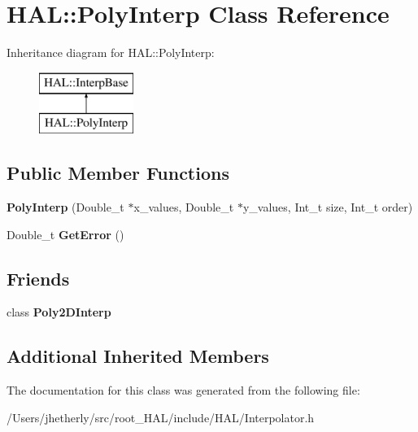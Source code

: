 \hypertarget{class_h_a_l_1_1_poly_interp}{\section{H\+A\+L\+:\+:Poly\+Interp Class Reference}
\label{class_h_a_l_1_1_poly_interp}
}
Inheritance diagram for H\+A\+L\+:\+:Poly\+Interp\+:\begin{figure}[H]
\begin{center}
\leavevmode
\includegraphics[height=2.000000cm]{class_h_a_l_1_1_poly_interp}
\end{center}
\end{figure}
\subsection*{Public Member Functions}
\begin{DoxyCompactItemize}
\item 
\hypertarget{class_h_a_l_1_1_poly_interp_af44f92e27052c066755a5beae2dc7b1b}{{\bfseries Poly\+Interp} (Double\+\_\+t $\ast$x\+\_\+values, Double\+\_\+t $\ast$y\+\_\+values, Int\+\_\+t size, Int\+\_\+t order)}\label{class_h_a_l_1_1_poly_interp_af44f92e27052c066755a5beae2dc7b1b}

\item 
\hypertarget{class_h_a_l_1_1_poly_interp_a1d87892f07ecdacaf6467a63371f044e}{Double\+\_\+t {\bfseries Get\+Error} ()}\label{class_h_a_l_1_1_poly_interp_a1d87892f07ecdacaf6467a63371f044e}

\end{DoxyCompactItemize}
\subsection*{Friends}
\begin{DoxyCompactItemize}
\item 
\hypertarget{class_h_a_l_1_1_poly_interp_a1d517ab352221a0d0a7fbfc8698724d7}{class {\bfseries Poly2\+D\+Interp}}\label{class_h_a_l_1_1_poly_interp_a1d517ab352221a0d0a7fbfc8698724d7}

\end{DoxyCompactItemize}
\subsection*{Additional Inherited Members}


The documentation for this class was generated from the following file\+:\begin{DoxyCompactItemize}
\item 
/\+Users/jhetherly/src/root\+\_\+\+H\+A\+L/include/\+H\+A\+L/Interpolator.\+h\end{DoxyCompactItemize}
